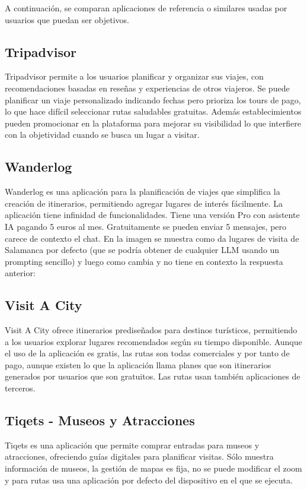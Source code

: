 
A continuación, se comparan aplicaciones de referencia o similares usadas por usuarios que puedan ser objetivos.

\subsection{Tripadvisor}
Tripadvisor permite a los usuarios planificar y organizar sus viajes, con recomendaciones basadas en reseñas y experiencias de otros viajeros. Se puede planificar un viaje personalizado indicando fechas pero prioriza los tours de pago, lo que hace difícil seleccionar rutas saludables gratuitas. Además establecimientos pueden promocionar en la plataforma para mejorar su visibilidad lo que interfiere con la objetividad cuando se busca un lugar a visitar.

\subsection{Wanderlog}
Wanderlog es una aplicación para la planificación de viajes que simplifica la creación de itinerarios, permitiendo agregar lugares de interés fácilmente. La aplicación tiene infinidad de funcionalidades. Tiene una versión Pro con asistente IA pagando 5 euros al mes. Gratuitamente se pueden enviar 5 mensajes, pero carece de contexto el chat. En la imagen se muestra como da lugares de visita de Salamanca por defecto (que se podría obtener de cualquier LLM usando un prompting sencillo) y luego como cambia y no tiene en contexto la respuesta anterior:

\subsection{Visit A City}
Visit A City ofrece itinerarios prediseñados para destinos turísticos, permitiendo a los usuarios explorar lugares recomendados según su tiempo disponible. Aunque el uso de la aplicación es gratis, las rutas son todas comerciales y por tanto de pago, aunque existen lo que la aplicación llama planes que son itinerarios generados por usuarios que son gratuitos. Las rutas usan también aplicaciones de terceros.

\subsection{Tiqets - Museos y Atracciones}
Tiqets es una aplicación que permite comprar entradas para museos y atracciones, ofreciendo guías digitales para planificar visitas. Sólo muestra información de museos, la gestión de mapas es fija, no se puede modificar el zoom y para rutas usa una aplicación por defecto del dispositivo en el que se ejecuta.


